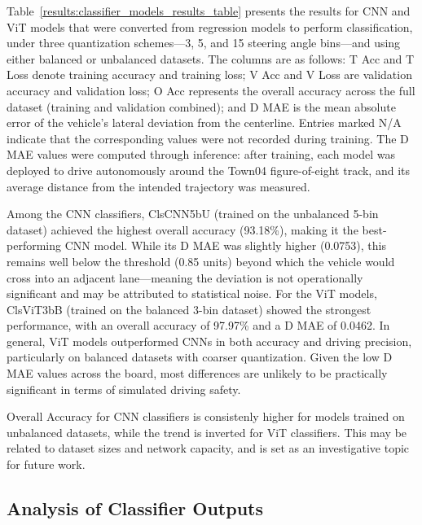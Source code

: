 Table~\ref{results:classifier_models_results_table} presents the results for CNN and ViT models that were converted from regression models to perform classification, under three quantization schemes—3, 5, and 15 steering angle bins—and using either balanced or unbalanced datasets. The columns are as follows: T Acc and T Loss denote training accuracy and training loss; V Acc and V Loss are validation accuracy and validation loss; O Acc represents the overall accuracy across the full dataset (training and validation combined); and D MAE is the mean absolute error of the vehicle’s lateral deviation from the centerline. Entries marked N/A indicate that the corresponding values were not recorded during training. The D MAE values were computed through inference: after training, each model was deployed to drive autonomously around the Town04 figure-of-eight track, and its average distance from the intended trajectory was measured.

Among the CNN classifiers, ClsCNN5bU (trained on the unbalanced 5-bin dataset) achieved the highest overall accuracy (93.18\%), making it the best-performing CNN model. While its D MAE was slightly higher (0.0753), this remains well below the threshold (0.85 units) beyond which the vehicle would cross into an adjacent lane—meaning the deviation is not operationally significant and may be attributed to statistical noise. For the ViT models, ClsViT3bB (trained on the balanced 3-bin dataset) showed the strongest performance, with an overall accuracy of 97.97\% and a D MAE of 0.0462. In general, ViT models outperformed CNNs in both accuracy and driving precision, particularly on balanced datasets with coarser quantization. Given the low D MAE values across the board, most differences are unlikely to be practically significant in terms of simulated driving safety.

Overall Accuracy for CNN classifiers is consistenly higher for models trained on unbalanced datasets, while the trend is inverted for ViT classifiers. This may be related to dataset sizes and network capacity, and is set as an investigative topic for future work.


\subsection{Analysis of Classifier Outputs}


